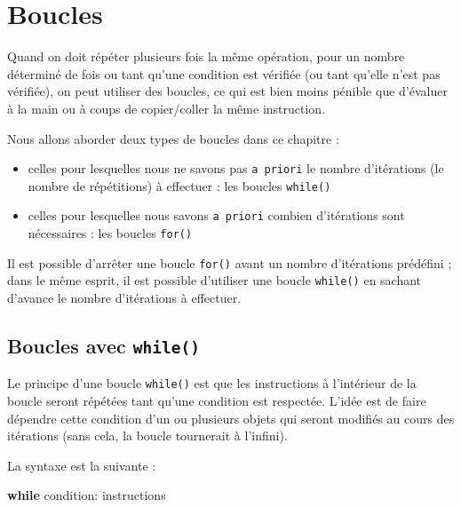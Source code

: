 \documentclass[12pt,]{book}
\newenvironment{Shaded}{\begin{snugshade}}{\end{snugshade}}
\newcommand{\ControlFlowTok}[1]{\textcolor[rgb]{0.13,0.29,0.53}{\textbf{#1}}}
\newcommand{\NormalTok}[1]{#1}
\providecommand{\tightlist}{%
  \setlength{\itemsep}{0pt}\setlength{\parskip}{0pt}}
\numberwithin{equation}{section}
\numberwithin{countremarque}{section}
\let\BeginKnitrBlock\begin \let\EndKnitrBlock\end
\begin{document}
\chapter{Boucles}\label{boucles}

Quand on doit répéter plusieurs fois la même opération, pour un nombre
déterminé de fois ou tant qu'une condition est vérifiée (ou tant qu'elle
n'est pas vérifiée), on peut utiliser des boucles, ce qui est bien moins
pénible que d'évaluer à la main ou à coups de copier/coller la même
instruction.

Nous allons aborder deux types de boucles dans ce chapitre :

\begin{itemize}
\tightlist
\item
  celles pour lesquelles nous ne savons pas \texttt{a\ priori} le nombre
  d'itérations (le nombre de répétitions) à effectuer : les boucles
  \texttt{while()}
\item
  celles pour lesquelles nous savons \texttt{a\ priori} combien
  d'itérations sont nécessaires : les boucles \texttt{for()}
\end{itemize}

\BeginKnitrBlock{remarque}
Il est possible d'arrêter une boucle \texttt{for()} avant un nombre
d'itérations prédéfini ; dans le même esprit, il est possible d'utiliser
une boucle \texttt{while()} en sachant d'avance le nombre d'itérations à
effectuer.
\EndKnitrBlock{remarque}

\section{\texorpdfstring{Boucles avec
\texttt{while()}}{Boucles avec while()}}\label{boucles-avec-while}

Le principe d'une boucle \texttt{while()} est que les instructions à
l'intérieur de la boucle seront répétées tant qu'une condition est
respectée. L'idée est de faire dépendre cette condition d'un ou
plusieurs objets qui seront modifiés au cours des itérations (sans cela,
la boucle tournerait à l'infini).

La syntaxe est la suivante :

\begin{Shaded}
\begin{Highlighting}[]
\ControlFlowTok{while}\NormalTok{ condition:}
\NormalTok{  instructions}
\end{Highlighting}
\end{Shaded}
\end{document}
